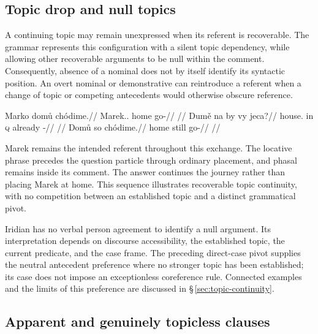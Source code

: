 \subsection{Topic drop and null topics}\label{sec:tc-topic-drop}

A continuing topic may remain unexpressed when its referent is recoverable.
 The grammar represents this configuration with a silent topic dependency,
 while allowing other recoverable arguments to be null within the comment.
 Consequently, absence of a nominal does not by itself identify its syntactic
 position. An overt nominal or demonstrative can reintroduce a referent when
 a change of topic or competing antecedents would otherwise obscure reference.

\pex\label{ex:tc-topdrop}
\a\label{ex:tc-topdrop-overt}%
\begingl
\gla Marko domů chódime.//
\glb Marek.\Dir{}.\Def{} home go-\Prog{}//
\glft {} //
\endgl
\a\label{ex:tc-topdrop-null1}%
\begingl
\gla Dumě na by vy jeca?//
\glb house.\Ind{} in \textsc{q} already \Exst{}-\Cont{}//
\glft {}
      //
\endgl
\a\label{ex:tc-topdrop-null2}%
\begingl
\gla Domů so chódime.//
\glb home still go-\Prog{}//
\glft {}
      //
\endgl
\xe

\noindent Marek remains the intended referent throughout this exchange.
 The locative phrase precedes the question particle through ordinary
 placement, and phasal  remains inside its comment. The answer continues the journey rather than placing
 Marek at home. This sequence illustrates recoverable topic continuity, with
 no competition between an established topic and a distinct grammatical pivot.

Iridian has no verbal person agreement to identify a null argument. Its
 interpretation depends on discourse accessibility, the established topic,
 the current predicate, and the case frame. The preceding direct-case pivot
 supplies the neutral antecedent preference where no stronger topic has been
 established; its case does not impose an exceptionless coreference rule.
 Connected examples and the limits of this preference are discussed in
 §\,\ref{sec:topic-continuity}.

\subsection{Apparent and genuinely topicless clauses}
\label{sec:tc-topicless}

